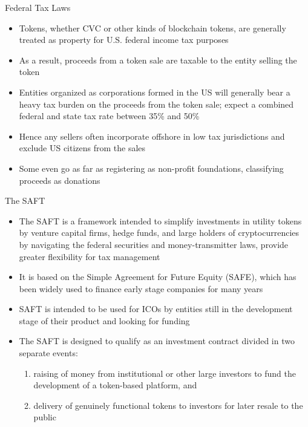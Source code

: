 \documentclass[11pt]{beamer}
\begin{document}

\begin{frame}{Federal Tax Laws}
	\begin{itemize}
		\item Tokens, whether CVC or other kinds of blockchain tokens, are generally treated as property for U.S. federal income tax purposes
		\item As a result, proceeds from a token sale are taxable to the entity selling the token
		\item Entities organized as corporations formed in the US will generally bear a heavy tax burden on the proceeds from the token sale; expect a combined federal and state tax rate between 35\% and 50\%
		\item Hence any sellers often incorporate offshore in low tax jurisdictions and exclude US citizens from the sales
		\item Some even go as far as registering as non-profit foundations, classifying proceeds as donations
	\end{itemize}
\end{frame}


\begin{frame}{The SAFT}
	\begin{itemize}
		\item The SAFT is a framework intended to simplify investments in utility tokens by venture capital firms, hedge funds, and large holders of cryptocurrencies by navigating the federal securities and money-transmitter laws, provide greater flexibility for tax management
		\item It is based on the Simple Agreement for Future Equity (SAFE), which has been widely used to finance early stage companies for many years
		\item SAFT is intended to be used for ICOs by entities still in the development stage of their product and looking for funding
		\item The SAFT is designed to qualify as an investment contract divided in two separate events:
		\begin{enumerate}
			\item raising of money from institutional or other large investors to fund the development of a token-based platform, and
			\item delivery of genuinely functional tokens to investors for later resale to the public
		\end{enumerate}
	\end{itemize}
\end{frame}
\end{document}
